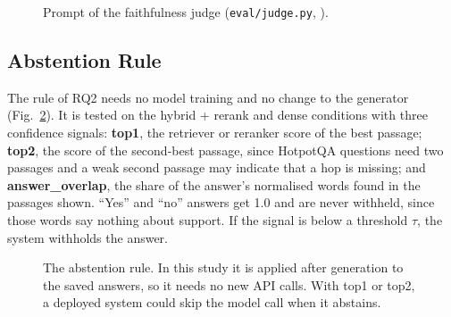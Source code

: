 \begin{figure}[htbp]

\caption{Prompt of the faithfulness judge (\texttt{eval/judge.py}, ).}\label{fig:lst-judge}
\end{figure}

\subsection{Abstention Rule}\label{sec:abstention}
The rule of RQ2 needs no model training and no change to the generator (Fig.~\ref{fig:abstention}). It is
tested on the hybrid + rerank and dense conditions with three confidence signals: \textbf{top1}, the retriever or
reranker score of the best passage; \textbf{top2}, the score of the second-best passage, since HotpotQA questions
need two passages and a weak second passage may indicate that a hop is missing; and \textbf{answer\_overlap}, the
share of the answer's normalised words found in the passages shown. ``Yes'' and ``no'' answers get 1.0 and are never
withheld, since those words say nothing about support. If the signal is below a threshold $\tau$, the system
withholds the answer.

\begin{figure}[htbp]
\centering
{}
\caption{The abstention rule. In this study it is applied after generation to the saved answers, so
it needs no new API calls. With top1 or top2, a deployed system could skip the model call when it
abstains.}\label{fig:abstention}
\end{figure}

